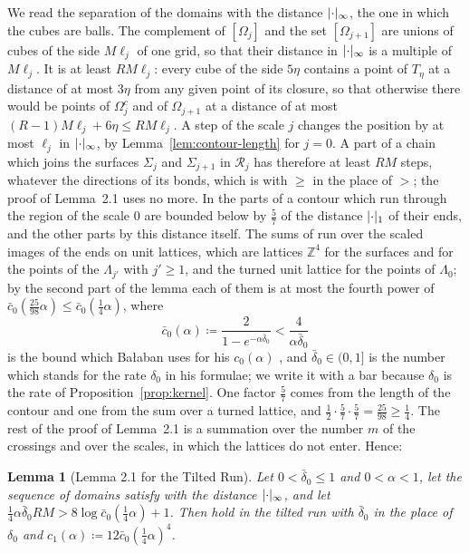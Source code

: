 \documentclass[11pt]{preprint}
\DeclarePairedDelimiter{\abs}{\lvert}{\rvert}
\numberwithin{equation}{section}
\newtheorem{lemma}[theorem]{Lemma}
\theoremstyle{definition}
\theoremstyle{remark}
\theoremstyle{plain}
\begin{document}
We read the separation \cite[(2.2)]{BalabanPRT2} of the domains with the distance $\abs\cdot_\infty$, the one in which the cubes are balls. The complement of $[\Omega_j]$ and the set $[\Omega_{j+1}]$ are unions of cubes of the side $M\ell_j$ of one grid, so that their distance in $\abs\cdot_\infty$ is a multiple of $M\ell_j$. It is at least $RM\ell_j$: every cube of the side $5\eta$ contains a point of $T_\eta$ at a distance of at most $3\eta$ from any given point of its closure, so that otherwise there would be points of $\Omega_j^c$ and of $\Omega_{j+1}$ at a distance of at most $(R - 1)M\ell_j + 6\eta \leq RM\ell_j$. A step of the scale $j$ changes the position by at most $\ell_j$ in $\abs\cdot_\infty$, by Lemma~\ref{lem:contour-length} for $j = 0$. A part of a chain which joins the surfaces $\Sigma_j$ and $\Sigma_{j+1}$ in $\mathcal R_j$ has therefore at least $RM$ steps, whatever the directions of its bonds, which is \cite[(2.57)]{BalabanPRT2} with $\geq$ in the place of $>$; the proof of Lemma~2.1 uses no more. In \cite[(2.48)]{BalabanPRT2} the parts of a contour which run through the region of the scale $0$ are bounded below by $\frac57$ of the distance $\abs\cdot_1$ of their ends, and the other parts by this distance itself. The sums of \cite[(2.58)]{BalabanPRT2} run over the scaled images of the ends on unit lattices, which are lattices $\mathbb Z^4$ for the surfaces and for the points of the $\Lambda_{j'}$ with $j' \geq 1$, and the turned unit lattice for the points of $\Lambda_0$; by the second part of the lemma each of them is at most the fourth power of $\bar c_0(\frac{25}{98}\alpha) \leq \bar c_0(\frac14\alpha)$, where
\begin{equation}\label{eq:c-zero-bar}
    \bar c_0(\alpha) \coloneqq \frac{2}{1 - e^{-\alpha\bar\delta_0}} < \frac{4}{\alpha\bar\delta_0}
\end{equation}
is the bound which Ba{\l}aban uses for his $c_0(\alpha)$ \cite[p.~233]{BalabanPRT2}, and $\bar\delta_0 \in (0, 1]$ is the number which stands for the rate $\delta_0$ in his formulae; we write it with a bar because $\delta_0$ is the rate of Proposition~\ref{prop:kernel}. One factor $\frac57$ comes from the length of the contour and one from the sum over a turned lattice, and $\frac12 \cdot \frac57 \cdot \frac57 = \frac{25}{98} \geq \frac14$. The rest of the proof of Lemma~2.1 is a summation over the number $m$ of the crossings and over the scales, in which the lattices do not enter. Hence:

\begin{lemma}[Lemma 2.1 for the Tilted Run]\label{lem:distance-sums}
Let $0 < \bar\delta_0 \leq 1$ and $0 < \alpha < 1$, let the sequence of domains satisfy \cite[(2.2)]{BalabanPRT2} with the distance $\abs\cdot_\infty$, and let $\frac14\alpha\bar\delta_0RM > 8\log\bar c_0(\frac14\alpha) + 1$. Then \cite[(2.60)--(2.63), p.~234]{BalabanPRT2} hold in the tilted run with $\bar\delta_0$ in the place of $\delta_0$ and $c_1(\alpha) \coloneqq 12\bar c_0(\frac14\alpha)^4$.
\end{lemma}
\end{document}
